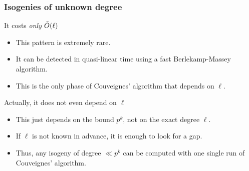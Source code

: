\documentclass[10pt]{beamer}
\renewcommand{\emph}[1]{{\usebeamercolor[fg]{structure}#1}}
\begin{document}
\begin{frame}
  \frametitle{Isogenies of unknown degree}
  
  \large 

  \begin{block}{It costs \textit{only} $\tilde{O}(\ell)$}
    \begin{itemize}
    \item This pattern is extremely rare.
    \item It can be detected in quasi-linear time using a fast
      Berlekamp-Massey algorithm.
    \item This is the only phase of Couveignes' algorithm that depends
      on $\ell$.
    \end{itemize}
  \end{block}
  
  \pause 

  \begin{block}{Actually, it does not even depend on $\ell$}
    \begin{itemize}
    \item This just depends on the bound $p^k$, not on the exact
      degree $\ell$.
    \item If $\ell$ is not known in advance, it is enough to look
      for a \emph{gap}.
    \item Thus, any isogeny of degree $\ll p^k$ can be computed with
      one single run of Couveignes' algorithm.
    \end{itemize} 
  \end{block} 
\end{frame}

\end{document}
